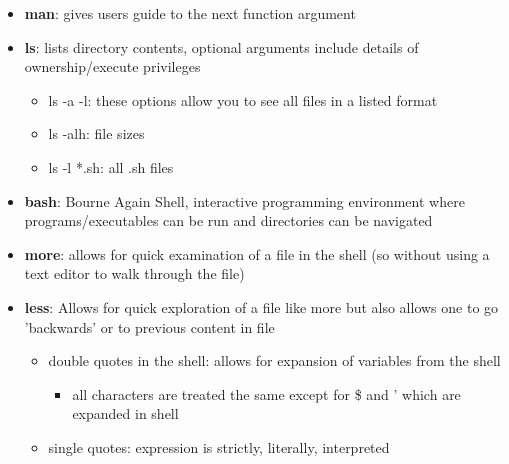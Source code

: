 \begin{itemize}
	\item \textbf{man}: gives users guide to the next function argument
	\item \textbf{ls}: lists directory contents, optional arguments include details of ownership/execute privileges
    \begin{itemize}
    	\item ls -a -l: these options allow you to see all files in a listed format
        \item ls -alh: file sizes
        \item ls -l *.sh: all .sh files
    \end{itemize}
	\item \textbf{bash}: Bourne Again Shell, interactive programming environment where programs/executables can be run and directories can be navigated
	\item \textbf{more}:  allows for quick examination of a file in the shell (so without using a text editor to walk through the file)
	\item \textbf{less}: Allows for quick exploration of a file like more but also allows one to go 'backwards' or to previous content in file
    \begin{itemize}
    	\item double quotes in the shell: allows for expansion of variables from the shell
		\begin{itemize}
			\item all characters are treated the same except for \$ and ' which are expanded in shell
		\end{itemize}
        \item single quotes: expression is strictly, literally, interpreted
    \end{itemize}
\end{itemize}











